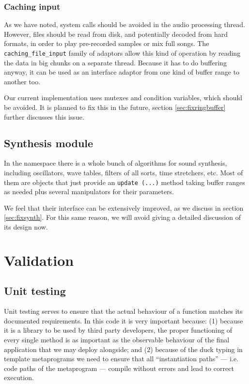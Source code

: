 \subsubsection{Caching input}

As we have noted, system calls should be avoided in the audio
processing thread. However, files should be read from disk, and
potentially decoded from hard formats, in order to play pre-recorded
samples or mix full songs. The \texttt{caching\_file\_input} family of
adaptors allow this kind of operation by reading the data in big
chunks on a separate thread. Because it has to do buffering anyway, it
can be used as an interface adaptor from one kind of buffer range to
another too. 

Our current implementation uses mutexes and condition variables, which
should be avoided. It is planned to fix this in the future, section
\ref{sec:fixringbuffer} further discusses this issue.

\subsection{Synthesis module}
\label{sec:ns-synth}

In the  namespace there is a whole bunch of
algorithms for sound synthesis, including oscillators, wave tables,
filters of all sorts, time stretchers, etc. Most of them are objects
that just provide an \texttt{update (...)} method taking buffer ranges
as needed plus several manipulators for their parameters.

We feel that their interface can be extensively improved, as
we discuss in section \ref{sec:fixsynth}. For this same reason, we
will avoid giving a detailed discussion of its design now.

\section{Validation}

\subsection{Unit testing}

Unit testing serves to ensure that the actual behaviour of a function
matches its documented requirements. In this code it is very important
because: (1) because it is a library to be used by third party
developers, the proper functioning of every single method is as
important as the observable behaviour of the final application that we
may deploy alongside; and (2) because of the duck typing in template
metaprograms we need to ensure that all ``instantiation paths'' ---
i.e. code paths of the metaprogram --- compile without errors and lead
to correct execution.

